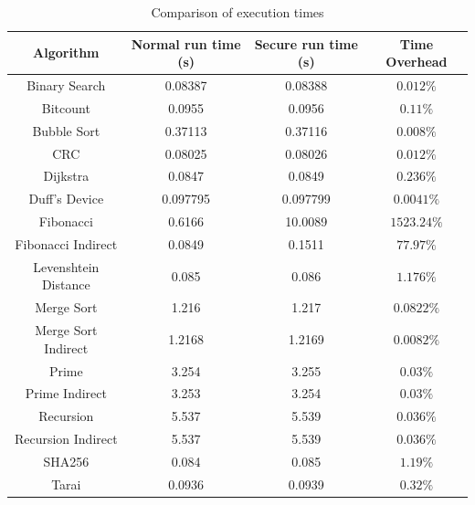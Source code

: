 \begin{table}
  \centering
  \begin{tabular}{|c|c|c|c|}
    \hline
    \textbf{Algorithm}   & \textbf{Normal run time (s)} & \textbf{Secure run time (s)} & \textbf{Time Overhead} \\
    \hline
    Binary Search        & 0.08387                      & 0.08388                      & $0.012\%$              \\
    \hline
    Bitcount             & 0.0955                       & 0.0956                       & $0.11\%$               \\
    \hline
    Bubble Sort          & 0.37113                      & 0.37116                      & $0.008\%$              \\
    \hline
    CRC                  & 0.08025                      & 0.08026                      & $0.012\%$              \\
    \hline
    Dijkstra             & 0.0847                       & 0.0849                       & $0.236\%$              \\
    \hline
    Duff's Device        & 0.097795                     & 0.097799                     & $0.0041\%$             \\
    \hline
    Fibonacci            & 0.6166                       & 10.0089                      & $1523.24\%$            \\
    \hline
    Fibonacci Indirect   & 0.0849                       & 0.1511                       & $77.97\%$              \\
    \hline
    Levenshtein Distance & 0.085                        & 0.086                        & $1.176\%$              \\
    \hline
    Merge Sort           & 1.216                        & 1.217                        & $0.0822\%$             \\
    \hline
    Merge Sort Indirect  & 1.2168                       & 1.2169                       & $0.0082\%$             \\
    \hline
    Prime                & 3.254                        & 3.255                        & $0.03\%$               \\
    \hline
    Prime Indirect       & 3.253                        & 3.254                        & $0.03\%$               \\
    \hline
    Recursion            & 5.537                        & 5.539                        & $0.036\%$              \\
    \hline
    Recursion Indirect   & 5.537                        & 5.539                        & $0.036\%$              \\
    \hline
    SHA256               & 0.084                        & 0.085                        & $1.19\%$               \\
    \hline
    Tarai                & 0.0936                       & 0.0939                       & $0.32\%$               \\
    \hline
  \end{tabular}
  \caption{Comparison of execution times}
  \label{tab:times}
\end{table}

